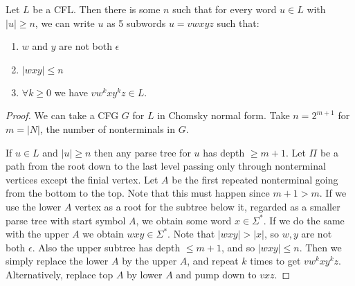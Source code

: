 \documentclass[10pt,a4paper]{article}
\begin{document}
\begin{theorem}
Let $L$ be a CFL. Then there is some $n$ such that for every word $u \in L$ with $|u| \geq n$, we can write $u$ as 5 subwords $u=vwxyz$ such that:
\begin{enumerate}
\item $w$ and $y$ are not both $\epsilon$
\item $|wxy|\leq n$
\item $\forall k \geq  0$ we have $vw^kxy^kz \in L$.
\end{enumerate}
\end{theorem}
\begin{proof}
We can take a CFG $G$ for $L$ in Chomsky normal form. Take $n=2^{m+1}$ for $m =|N|$, the number of nonterminals in $G$. 

If $u \in L$ and $|u| \geq n$ then any parse tree for $u$ has depth $\geq m+1$. Let $\Pi$ be a path from the root down to the last level passing only through nonterminal vertices except the finial vertex. Let $A$ be the first repeated nonterminal going from the bottom to the top. Note that this must happen since $m+1>m$. If we use the lower $A$ vertex as a root for the subtree below it, regarded as a smaller parse tree with start symbol $A$, we obtain some word $x \in \Sigma^{\ast}$. If we do the same with the upper $A$ we obtain $wxy \in \Sigma^{\ast}$. Note that $|wxy|>|x|$, so $w, y$ are not both $\epsilon$. Also the upper subtree has depth $\leq m+1$, and so $|wxy|\leq n$. Then we simply replace the lower $A$ by the upper $A$, and repeat $k$ times to get $vw^kxy^kz$. Alternatively, replace top $A$ by lower $A$ and pump down to $vxz$.
\end{proof}
\end{document}
